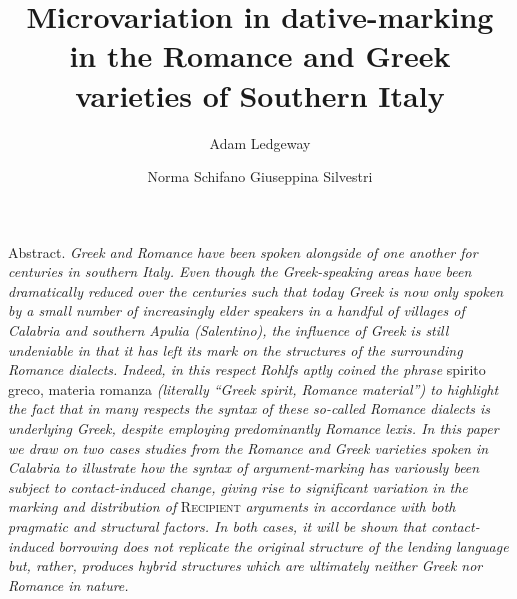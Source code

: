 \documentclass[output=paper,modfonts,nonflat]{langsci/langscibook}
\author{Adam Ledgeway\affiliation{}\and
Norma Schifano\affiliation{}\lastand
Giuseppina Silvestri\affiliation{}}
\title{Microvariation in dative-marking in the Romance and Greek varieties of Southern Italy}
\begin{document}
\maketitle 
 
\begin{styleStandard}
Abstract. \textit{Greek and Romance have been spoken alongside of one another for centuries in southern Italy. Even though the Greek-speaking areas have been dramatically reduced over the centuries such that today Greek is now only spoken by a small number of increasingly elder speakers in a handful of villages of Calabria and southern Apulia (Salentino), the influence of Greek is still undeniable in that it has left its mark on the structures of the surrounding Romance dialects. Indeed, in this respect Rohlfs aptly coined the phrase }spirito greco, materia romanza\textit{ (literally “Greek spirit, Romance material”) to highlight the fact that in many respects the syntax of these so-called Romance dialects is underlying Greek, despite employing predominantly Romance lexis. In this paper we draw on two cases studies from the Romance and Greek varieties spoken in Calabria to illustrate how the syntax of argument-marking has variously been subject to contact-induced change, giving rise to significant variation in the marking and distribution of }\textsc{Recipient}\textit{ arguments in accordance with both pragmatic and structural factors. In both cases, it will be shown that contact-induced borrowing does not replicate the original structure of the lending language but, rather, produces hybrid structures which are ultimately neither Greek nor Romance in nature.}
\end{styleStandard}
\end{document}
